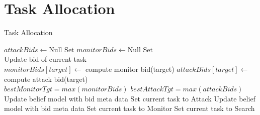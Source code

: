 \section{Task Allocation}
\begin{algorithm}[H]
	\caption{Task Allocation}
	\label{alg:taskAlloc}
	\begin{algorithmic}[1]
		\State $attackBids \gets $Null Set
		\State $monitorBids \gets $Null Set
		\\
			\State Update bid of current task
		\EndIf
		\\
			\State $monitorBids[target] \gets$ compute monitor bid(target)
				\State $attackBids[target] \gets$ compute attack bid(target)
			\EndIf
		\EndFor
		\\
		\State $bestMonitorTgt = max(monitorBids)$
		\State $bestAttackTgt = max(attackBids)$
		\\
			\State Update belief model with bid meta data
			\State Set current task to Attack
			\State Update belief model with bid meta data		
			\State Set current task to Monitor			
		\Else
			\State Set current task to Search
		\EndIf
		
	\end{algorithmic}
\end{algorithm}

